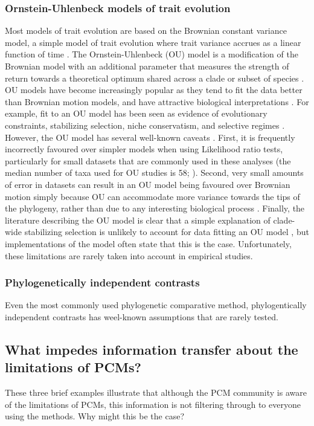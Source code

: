 \documentclass[a4paper,12pt]{article}
\begin{document}
\subsubsection{Ornstein-Uhlenbeck models of trait evolution}
Most models of trait evolution are based on the Brownian constant variance model, a simple model of trait evolution where trait variance accrues as a linear function of time \citep{cavalli1967,felsenstein1973maximum}.
The Ornstein-Uhlenbeck (OU) model is a modification of the Brownian model with an additional parameter that measures the strength of return towards a theoretical optimum shared across a clade or subset of species \citep{Butler:2004aa,hansen1997stabilizing}.
OU models have become increasingly popular as they tend to fit the data better than Brownian motion models, and have attractive biological interpretations \citep{cooper2016}.
For example, fit to an OU model has been seen as evidence of evolutionary constraints, stabilizing selection, niche conservatism, and selective regimes \citep{}.
However, the OU model has several well-known caveats \citep[see][]{ho2013asymptotic,ho2014intrinsic,boettiger2012your}. 
First, it is frequently incorrectly favoured over simpler models when using Likelihood ratio tests, particularly for small datasets that are commonly used in these analyses (the median number of taxa used for OU studies is 58; \citealp{cooper2016}). 
Second, very small amounts of error in datasets can result in an OU model being favoured over Brownian motion simply because OU can accommodate more variance towards the tips of the phylogeny, rather than due to any interesting biological process \citep{boettiger2012your,pennell2015model}.
Finally, the literature describing the OU model is clear that a simple explanation of clade-wide stabilizing selection is unlikely to account for data fitting an OU model \citep[e.g.][]{hansen1997stabilizing,hansen2005assessing}, but implementations of the model often state that this is the case.
Unfortunately, these limitations are rarely taken into account in empirical studies.

\subsubsection{Phylogenetically independent contrasts} %
Even the most commonly used phylogenetic comparative method, phylogentically independent contrasts has weel-known assumptions that are rarely tested.

\subsection{What impedes information transfer about the limitations of PCMs?}
These three brief examples illustrate that although the PCM community is aware of the limitations of PCMs, this information is not filtering through to everyone using the methods. 
Why might this be the case?
\end{document}
